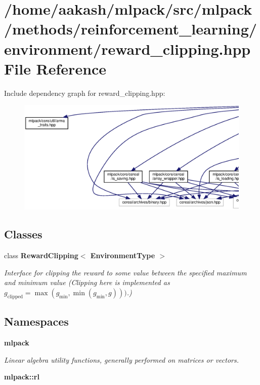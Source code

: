 \section{/home/aakash/mlpack/src/mlpack/methods/reinforcement\+\_\+learning/environment/reward\+\_\+clipping.hpp File Reference}
\label{reward__clipping_8hpp}
Include dependency graph for reward\+\_\+clipping.\+hpp\+:
\nopagebreak
\begin{figure}[H]
\begin{center}
\leavevmode
\includegraphics[width=350pt]{reward__clipping_8hpp__incl}
\end{center}
\end{figure}
\subsection*{Classes}
\begin{DoxyCompactItemize}
\item 
class \textbf{ Reward\+Clipping$<$ Environment\+Type $>$}
\begin{DoxyCompactList}\small\item\em Interface for clipping the reward to some value between the specified maximum and minimum value (Clipping here is implemented as $ g_{\text{clipped}} = \max(g_{\text{min}}, \min(g_{\text{min}}, g))) $.) \end{DoxyCompactList}\end{DoxyCompactItemize}
\subsection*{Namespaces}
\begin{DoxyCompactItemize}
\item 
 \textbf{ mlpack}
\begin{DoxyCompactList}\small\item\em Linear algebra utility functions, generally performed on matrices or vectors. \end{DoxyCompactList}\item 
 \textbf{ mlpack\+::rl}
\end{DoxyCompactItemize}



